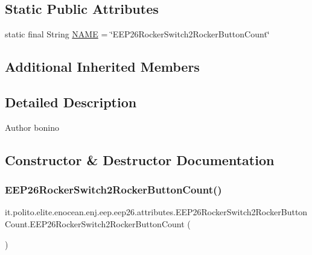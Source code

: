 \subsection*{Static Public Attributes}
\begin{DoxyCompactItemize}
\item 
static final String \hyperlink{classit_1_1polito_1_1elite_1_1enocean_1_1enj_1_1eep_1_1eep26_1_1attributes_1_1_e_e_p26_rocker_switch2_rocker_button_count_a47241a50557270e6aedf63ccd0a3be92}{N\+A\+ME} = \char`\"{}E\+E\+P26\+Rocker\+Switch2\+Rocker\+Button\+Count\char`\"{}
\end{DoxyCompactItemize}
\subsection*{Additional Inherited Members}


\subsection{Detailed Description}
\begin{DoxyAuthor}{Author}
bonino 
\end{DoxyAuthor}


\subsection{Constructor \& Destructor Documentation}
\hypertarget{classit_1_1polito_1_1elite_1_1enocean_1_1enj_1_1eep_1_1eep26_1_1attributes_1_1_e_e_p26_rocker_switch2_rocker_button_count_ae09aa31944b54db51cda3e70e65e1c16}{}\label{classit_1_1polito_1_1elite_1_1enocean_1_1enj_1_1eep_1_1eep26_1_1attributes_1_1_e_e_p26_rocker_switch2_rocker_button_count_ae09aa31944b54db51cda3e70e65e1c16} 
\subsubsection{\texorpdfstring{E\+E\+P26\+Rocker\+Switch2\+Rocker\+Button\+Count()}{EEP26RockerSwitch2RockerButtonCount()}\hspace{0.1cm}{\footnotesize\ttfamily [1/2]}}
{\footnotesize\ttfamily it.\+polito.\+elite.\+enocean.\+enj.\+eep.\+eep26.\+attributes.\+E\+E\+P26\+Rocker\+Switch2\+Rocker\+Button\+Count.\+E\+E\+P26\+Rocker\+Switch2\+Rocker\+Button\+Count (\begin{DoxyParamCaption}{ }\end{DoxyParamCaption})}


